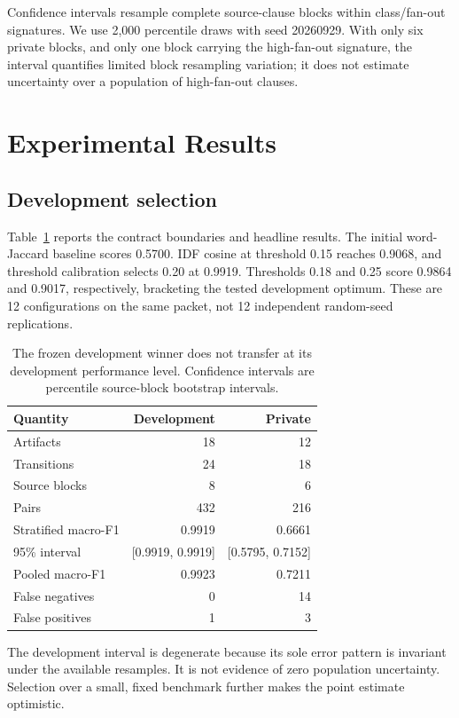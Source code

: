 \documentclass{article}
\begin{document}
Confidence intervals resample complete source-clause blocks within class/fan-out signatures. We use 2,000 percentile draws with seed 20260929. With only six private blocks, and only one block carrying the high-fan-out signature, the interval quantifies limited block resampling variation; it does not estimate uncertainty over a population of high-fan-out clauses.

\section{Experimental Results}

\subsection{Development selection}

Table~\ref{tab:main} reports the contract boundaries and headline results. The initial word-Jaccard baseline scores 0.5700. IDF cosine at threshold 0.15 reaches 0.9068, and threshold calibration selects 0.20 at 0.9919. Thresholds 0.18 and 0.25 score 0.9864 and 0.9017, respectively, bracketing the tested development optimum. These are 12 configurations on the same packet, not 12 independent random-seed replications.

\begin{table}[t]
\caption{The frozen development winner does not transfer at its development performance level. Confidence intervals are percentile source-block bootstrap intervals.}
\label{tab:main}
\centering
\small
\setlength{\tabcolsep}{4pt}
\begin{tabular}{lrr}
\toprule
Quantity & Development & Private \\
\midrule
Artifacts & 18 & 12 \\
Transitions & 24 & 18 \\
Source blocks & 8 & 6 \\
Pairs & 432 & 216 \\
Stratified macro-F1 & 0.9919 & 0.6661 \\
95\% interval & [0.9919, 0.9919] & [0.5795, 0.7152] \\
Pooled macro-F1 & 0.9923 & 0.7211 \\
False negatives & 0 & 14 \\
False positives & 1 & 3 \\
\bottomrule
\end{tabular}
\end{table}

The development interval is degenerate because its sole error pattern is invariant under the available resamples. It is not evidence of zero population uncertainty. Selection over a small, fixed benchmark further makes the point estimate optimistic.
\end{document}
